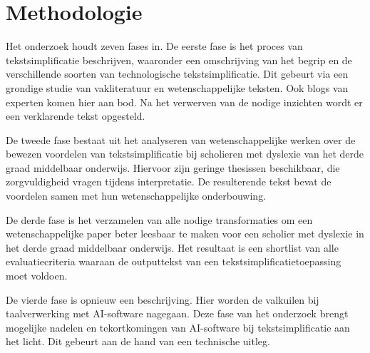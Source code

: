 

\section{Methodologie}%
\label{sec:methodologie}


Het onderzoek houdt zeven fases in. De eerste fase is het proces van tekstsimplificatie beschrijven, waaronder een omschrijving van het begrip en de verschillende soorten van technologische tekstsimplificatie. Dit gebeurt via een grondige studie van vakliteratuur en wetenschappelijke teksten. Ook blogs van experten komen hier aan bod. Na het verwerven van de nodige inzichten wordt er een verklarende tekst opgesteld.

De tweede fase bestaat uit het analyseren van wetenschappelijke werken over de bewezen voordelen van tekstsimplificatie bij scholieren met dyslexie van het derde graad middelbaar onderwijs. Hiervoor zijn geringe thesissen beschikbaar, die zorgvuldigheid vragen tijdens interpretatie. De resulterende tekst bevat de voordelen samen met hun wetenschappelijke onderbouwing.

De derde fase is het verzamelen van alle nodige transformaties om een wetenschappelijke paper beter leesbaar te maken voor een scholier met dyslexie in het derde graad middelbaar onderwijs. Het resultaat is een shortlist van alle evaluatiecriteria waaraan de outputtekst van een tekstsimplificatietoepassing moet voldoen.

De vierde fase is opnieuw een beschrijving. Hier worden de valkuilen bij taalverwerking met AI-software nagegaan. Deze fase van het onderzoek brengt mogelijke nadelen en tekortkomingen van AI-software bij tekstsimplificatie aan het licht. Dit gebeurt aan de hand van een technische uitleg.

